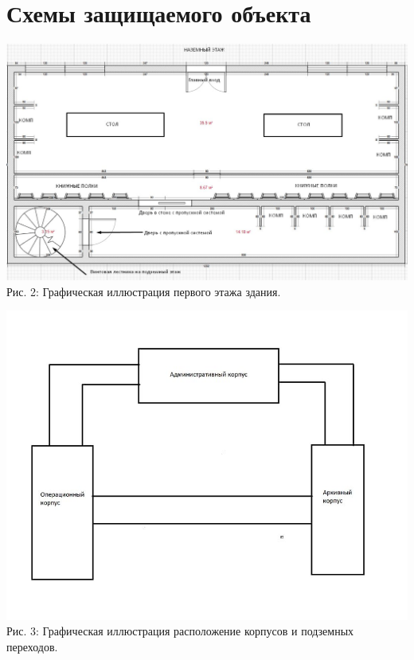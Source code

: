 \documentclass[utf8,14pt,a4paper,oneside,russian]{book}
\begin{document}
\newpage
\section{Схемы защищаемого объекта}
\begin{center}
  \includegraphics[scale=0.7, angle=-90]{shem1}\\

  Рис. 2: Графическая иллюстрация первого этажа здания.\\
\end{center}

\begin{center}
  \includegraphics[scale=0.75]{shem2}\\

  Рис. 3: Графическая иллюстрация расположение корпусов и подземных переходов.\\
\end{center}
\end{document}
